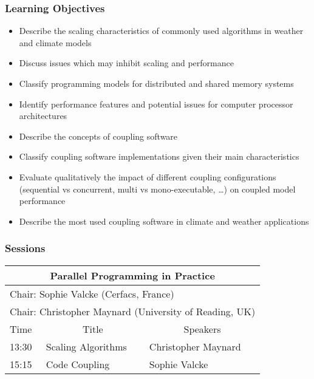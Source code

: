 \subsubsection{Learning Objectives}

\begin{itemize}

\item Describe the scaling characteristics of commonly used algorithms in weather and climate models
\item Discuss issues which may inhibit scaling and performance
\item Classify programming models for distributed and shared memory systems
\item Identify performance features and potential issues for computer processor architectures
\item Describe the concepts of coupling software
\item Classify coupling software implementations given their main characteristics
\item Evaluate qualitatively the impact of different coupling configurations (sequential vs concurrent, multi vs mono-executable, …) on coupled model performance
\item Describe the most used coupling software in climate and weather applications

\end{itemize}

\subsubsection{Sessions}

\begin{table}[H]
\begin{center}
\begin{tabular}{|l|l|l|}
\hline
\multicolumn{3}{|c|}{\textbf{Parallel Programming in Practice}} \\ \hline
\multicolumn{3}{|l|}{Chair: Sophie Valcke (Cerfacs, France)} \\
\multicolumn{3}{|l|}{Chair: Christopher Maynard (University of Reading, UK)} \\ \hline \hline
Time & \multicolumn{1}{c|}{Title} & \multicolumn{1}{c|}{Speakers} \\ \hline \hline
13:30 & Scaling Algorithms & Christopher Maynard \\ \hline
15:15 & Code Coupling & Sophie Valcke \\ \hline
\end{tabular}
\end{center}
\end{table}

